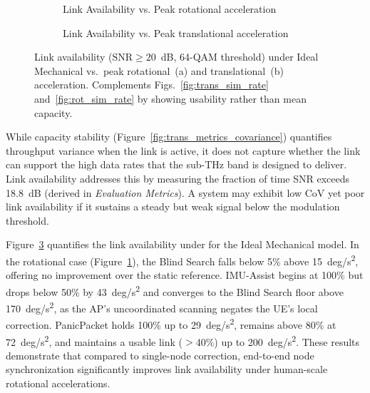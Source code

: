 \documentclass[fleqn,10pt]{wlscirep}
\begin{document}
\begin{figure}[h!]
    \centering
    \begin{subfigure}{0.48\linewidth}
        
        \vspace{-20pt}
        \caption{Link Availability vs. Peak rotational acceleration}
        \label{fig:rotionalLinkAvail}
    \end{subfigure}
    \hfill
    \begin{subfigure}{0.48\linewidth}
        
        \vspace{-20pt}
        \caption{Link Availability vs. Peak translational acceleration}
        \label{fig:translationalLinkAvail}
    \end{subfigure}
    \caption{Link availability ($\mathrm{SNR} \geq 20$~dB, 64-QAM threshold) under Ideal Mechanical vs.\ peak rotational~(a) and translational~(b) acceleration. Complements Figs.~\ref{fig:trans_sim_rate} and~\ref{fig:rot_sim_rate} by showing usability rather than mean capacity.}
    \label{fig:accelLinkAvail}
    \vspace{-5pt}
\end{figure}

While capacity stability (Figure~\ref{fig:trans_metrics_covariance}) quantifies throughput variance when the link is active, it does not capture whether the link can support the high data rates that the sub-THz band is designed to deliver\cite{Dang2020, Nokia2022}. Link availability addresses this by measuring the fraction of time SNR exceeds \SI{18.8}{dB} (derived in \textit{Evaluation Metrics}). A system may exhibit low CoV yet poor link availability if it sustains a steady but weak signal below the modulation threshold.

Figure~\ref{fig:accelLinkAvail} quantifies the link availability under for the Ideal Mechanical model. In the rotational case (Figure~\ref{fig:rotionalLinkAvail}), the Blind Search falls below 5\% above \SI{15}{deg/s^2}, offering no improvement over the static reference. IMU-Assist begins at 100\% but drops below 50\% by \SI{43}{deg/s^2} and converges to the Blind Search floor above \SI{170}{deg/s^2}, as the AP's uncoordinated scanning negates the UE's local correction. PanicPacket holds 100\% up to \SI{29}{deg/s^2}, remains above 80\% at \SI{72}{deg/s^2}, and maintains a usable link ($>$40\%) up to \SI{200}{deg/s^2}. These results demonstrate that compared to single-node correction, end-to-end node synchronization significantly improves link availability under human-scale rotational accelerations.
\end{document}
